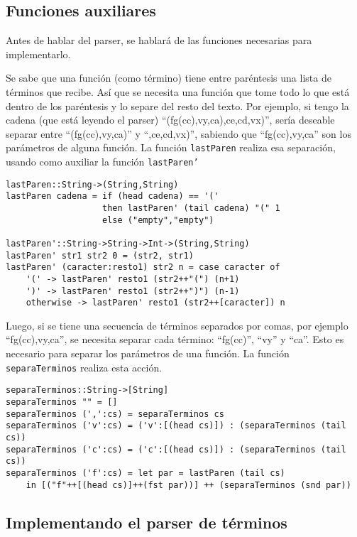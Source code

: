 \documentclass{article}
\begin{document}
\subsection{Funciones auxiliares}

Antes de hablar del parser, se hablará de las funciones necesarias para implementarlo.

Se sabe que una función (como término) tiene entre paréntesis una lista de términos que recibe. Así que se necesita una función que tome todo lo que está dentro de los paréntesis y lo separe del resto del texto. Por ejemplo, si tengo la cadena (que está leyendo el parser) ``(fg(cc),vy,ca),ce,cd,vx)'', sería deseable separar entre ``(fg(cc),vy,ca)'' y ``,ce,cd,vx)'', sabiendo que ``fg(cc),vy,ca'' son los parámetros de alguna función. La función \texttt{lastParen} realiza esa separación, usando como auxiliar la función \texttt{lastParen'}

\begin{verbatim}
lastParen::String->(String,String)
lastParen cadena = if (head cadena) == '('
                   then lastParen' (tail cadena) "(" 1
                   else ("empty","empty")

lastParen'::String->String->Int->(String,String)
lastParen' str1 str2 0 = (str2, str1)
lastParen' (caracter:resto1) str2 n = case caracter of
    '(' -> lastParen' resto1 (str2++"(") (n+1)
    ')' -> lastParen' resto1 (str2++")") (n-1)
    otherwise -> lastParen' resto1 (str2++[caracter]) n
\end{verbatim}

Luego, si se tiene una secuencia de términos separados por comas, por ejemplo ``fg(cc),vy,ca'', se necesita separar cada término: ``fg(cc)'', ``vy'' y ``ca''. Esto es necesario para separar los parámetros de una función. La función \texttt{separaTerminos} realiza esta acción.

\begin{verbatim}
separaTerminos::String->[String]
separaTerminos "" = []
separaTerminos (',':cs) = separaTerminos cs
separaTerminos ('v':cs) = ('v':[(head cs)]) : (separaTerminos (tail cs))
separaTerminos ('c':cs) = ('c':[(head cs)]) : (separaTerminos (tail cs))
separaTerminos ('f':cs) = let par = lastParen (tail cs)
    in [("f"++[(head cs)]++(fst par))] ++ (separaTerminos (snd par))
\end{verbatim}

\subsection{Implementando el parser de términos}
\end{document}
